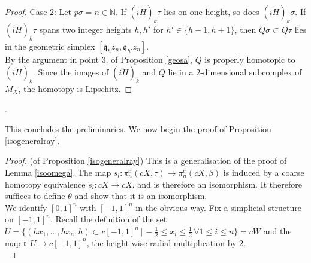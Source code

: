 \documentclass[a4paper,11pt]{article}
\theoremstyle{definition}
\theoremstyle{plain}
\theoremstyle{remark}
\begin{document}
{\begin{proof}
Case 2: Let $p\sigma = n\in \mathbb{N}$. If  $(\widetilde{iH})_{k}\tau$ lies on one height, so does $(\widetilde{iH})_{k}\sigma$. If $(\widetilde{iH})_{k}\tau$ spans two integer heights $h,h'$ for $h'\in \{h-1,h+1\}$, then $Q\sigma \subset Q\tau$ lies in the geometric simplex $[\mathfrak{q}_{h}z_{n}, \mathfrak{q}_{h'}z_{n}]$.\\

 By the argument in point $3$. of Proposition \ref{geosa}, $Q$ is properly homotopic to $(\widetilde{iH})_{k}$. Since the images of $(\widetilde{iH})_{k}$ and $Q$ lie in a $2$-dimensional subcomplex of $M_{X}$, the homotopy is Lipschitz. 

\end{proof}. 

This concludes the preliminaries. We now begin the proof of Proposition \ref{isogeneralray}. \\
 


\begin{proof} (of Proposition \ref{isogeneralray}) This is a generalisation of the proof of Lemma \ref{isoomega}. The map $s_{l}:\pi_{n}^c(cX,\tau)\rightarrow \pi_{n}^c(cX,\beta)$ is induced by a coarse homotopy equivalence $s_{l}: cX\rightarrow cX$, and is therefore an isomorphism. It therefore suffices to define $\theta$ and show that it is an isomorphism. \\

We identify $[0,1]^n$ with $[-1,1]^n$ in the obvious way. Fix a simplicial structure on $[-1,1]^n$. Recall the definition of the set $U = \{(hx_1,\dots,hx_n,h) \subset c[-1,1]^n \,|\, -\frac{1}{2}\leq x_i \leq \frac{1}{2} \, \forall 1\leq i\leq n\}=cW$ and the map $\mathfrak{r}: U\rightarrow c[-1,1]^n$, the height-wise radial multiplication by $2$.\\


\end{proof}}
\end{document}
